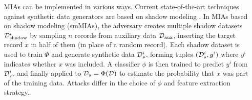 MIAs can be implemented in various ways. Current state-of-the-art techniques against synthetic data generators are based on shadow modeling \citep{shokri2017membership}.
In MIAs based on shadow modeling (smMIAs), the adversary creates multiple shadow datasets $\mathcal{D}_{\text{shadow}}^i$ by sampling $n$ records from auxiliary data $\mathcal{D}_{\text{aux}}$, inserting the target record $x$ in half of them (in place of a random record). Each shadow dataset is used to train $\Phi$ and generate synthetic data $\mathcal{D}_s^i$, forming tuples $(\mathcal{D}_s^i, y^i)$ where $y^i$ indicates whether $x$ was included. A classifier $\phi$ is then trained to predict $y^i$ from $\mathcal{D}_s^i$, and finally applied to $\mathcal{D}_s = \Phi(\mathcal{D})$ to estimate the probability that $x$ was part of the training data. Attacks differ in the choice of $\phi$ and feature extraction strategy.
